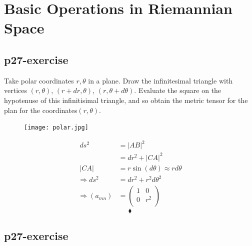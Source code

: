 \chapter{Basic Operations in Riemannian Space}
\pagebreak[4]

\section{p27-exercise}

\begin{tcolorbox}
Take polar coordinates $r, \theta$ in a plane. Draw the infinitesimal triangle with vertices $(r,\theta)$, $(r+dr,\theta)$, $(r,\theta + d\theta)$. Evaluate the square on the hypotenuse of this infinitisimal triangle, and so obtain the metric tensor for the plan for the coordinates$(r, \theta)$.\end{tcolorbox}
\begin{figure}[htp] 
    \centering
\texttt{[image: polar.jpg]}
\end{figure}
\begin{align} 
\ ds^2 &= |AB|^2\\
\ &= dr^2 +|CA|^2\\
\ |CA| &= r\sin(d\theta)\approx rd\theta\\
\Rightarrow ds^2 &= dr^2 + r^2d\theta^2\\
\Rightarrow (a_{mn}) &= \begin{pmatrix}
 1& 0 \\
0 & r^2 \\
\end{pmatrix}
\end{align}
$$\blacklozenge$$
\pagebreak[4]

\section{p27-exercise}

